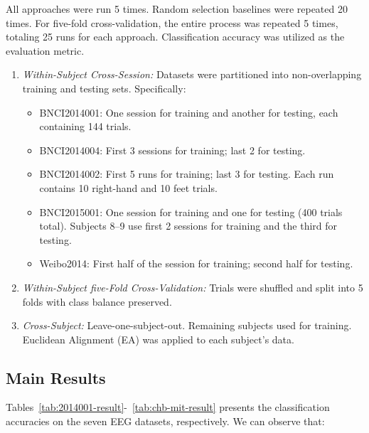 \documentclass[journal,twocolumn]{IEEEtran}
\begin{document}
All approaches were run 5 times. Random selection baselines were repeated 20 times. For five-fold cross-validation, the entire process was repeated 5 times, totaling 25 runs for each approach. Classification accuracy was utilized as the evaluation metric.

\begin{enumerate}
\item \emph{Within-Subject Cross-Session:}
Datasets were partitioned into non-overlapping training and testing sets. Specifically:
  \begin{itemize}
	\item BNCI2014001: One session for training and another for testing, each containing 144 trials.
	\item BNCI2014004: First 3 sessions for training; last 2 for testing.
    \item BNCI2014002: First 5 runs for training; last 3 for testing. Each run contains 10 right-hand and 10 feet trials.
    \item BNCI2015001: One session for training and one for testing (400 trials total). Subjects 8–9 use first 2 sessions for training and the third for testing.
    \item Weibo2014: First half of the session for training; second half for testing.
  \end{itemize}
  \item \emph{Within-Subject five-Fold Cross-Validation:}
Trials were shuffled and split into 5 folds with class balance preserved.
  \item \emph{Cross-Subject:}
Leave-one-subject-out. Remaining subjects used for training. Euclidean Alignment (EA) \cite{he2019transfer} was applied to each subject's data.
\end{enumerate}

\subsection{Main Results}
Tables~\ref{tab:2014001-result}-~\ref{tab:chb-mit-result} presents the classification accuracies on the seven EEG datasets, respectively. We can observe that:
\end{document}
